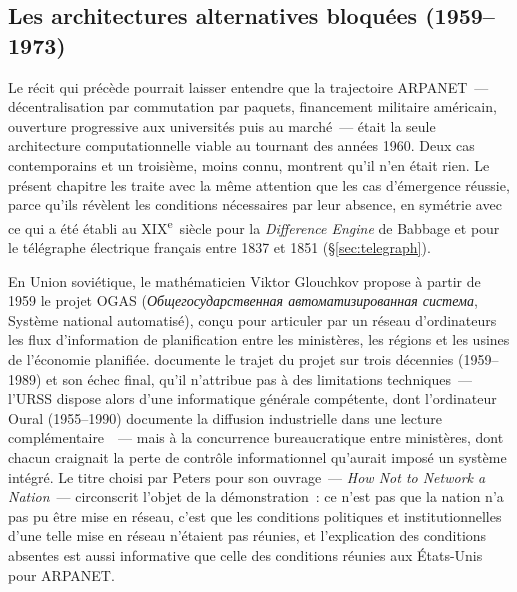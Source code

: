 

\subsection{Les architectures alternatives bloquées (1959--1973)}\label{subsec:alternatives_bloquees}

%
Le récit qui précède pourrait laisser entendre que la trajectoire ARPANET~--- décentralisation par commutation par paquets, financement militaire américain, ouverture progressive aux universités puis au marché~--- était la seule architecture computationnelle viable au tournant des années 1960. Deux cas contemporains et un troisième, moins connu, montrent qu'il n'en était rien. Le présent chapitre les traite avec la même attention que les cas d'émergence réussie, parce qu'ils révèlent les conditions nécessaires par leur absence, en symétrie avec ce qui a été établi au XIX\textsuperscript{e}~siècle pour la \emph{Difference Engine} de Babbage et pour le télégraphe électrique français entre 1837 et 1851 (§\ref{sec:telegraph}).

%
En Union soviétique, le mathématicien Viktor Glouchkov propose à partir de 1959 le projet OGAS (\emph{Общегосударственная автоматизированная система}, Système national automatisé), conçu pour articuler par un réseau d'ordinateurs les flux d'information de planification entre les ministères, les régions et les usines de l'économie planifiée. \textcite{peters_how_2016} documente le trajet du projet sur trois décennies (1959--1989) et son échec final, qu'il n'attribue pas à des limitations techniques~--- l'URSS dispose alors d'une informatique générale compétente, dont l'ordinateur Oural (1955--1990) documente la diffusion industrielle dans une lecture complémentaire~\parencite{koretsky_ural_2022}~--- mais à la concurrence bureaucratique entre ministères, dont chacun craignait la perte de contrôle informationnel qu'aurait imposé un système intégré. Le titre choisi par Peters pour son ouvrage~--- \emph{How Not to Network a Nation}~--- circonscrit l'objet de la démonstration~: ce n'est pas que la nation n'a pas pu être mise en réseau, c'est que les conditions politiques et institutionnelles d'une telle mise en réseau n'étaient pas réunies, et l'explication des conditions absentes est aussi informative que celle des conditions réunies aux États-Unis pour ARPANET.

